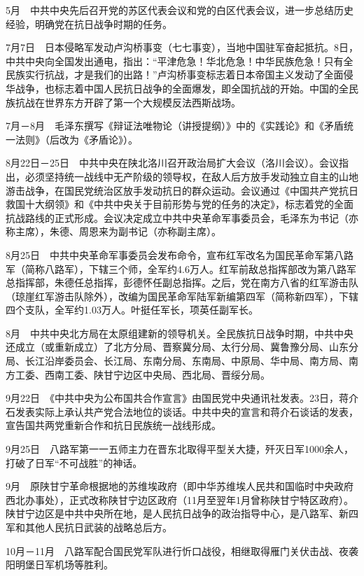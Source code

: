 \documentclass[10pt,a4paper,twocolumn]{book}
\begin{document}
5月　中共中央先后召开党的苏区代表会议和党的白区代表会议，进一步总结历史经验，明确党在抗日战争时期的任务。

7月7日　日本侵略军发动卢沟桥事变（七七事变），当地中国驻军奋起抵抗。8日，中共中央向全国发出通电，指出：“平津危急！华北危急！中华民族危急！只有全民族实行抗战，才是我们的出路！”卢沟桥事变标志着日本帝国主义发动了全面侵华战争，也标志着中国人民抗日战争的全面爆发，即全国抗战的开始。中国的全民族抗战在世界东方开辟了第一个大规模反法西斯战场。

7月－8月　毛泽东撰写《辩证法唯物论（讲授提纲）》中的《实践论》和《矛盾统一法则》（后改为《矛盾论》）。

8月22日－25日　中共中央在陕北洛川召开政治局扩大会议（洛川会议）。会议指出，必须坚持统一战线中无产阶级的领导权，在敌人后方放手发动独立自主的山地游击战争，在国民党统治区放手发动抗日的群众运动。会议通过《中国共产党抗日救国十大纲领》和《中共中央关于目前形势与党的任务的决定》，标志着党的全面抗战路线的正式形成。会议决定成立中共中央革命军事委员会，毛泽东为书记（亦称主席），朱德、周恩来为副书记（亦称副主席）。

8月25日　中共中央革命军事委员会发布命令，宣布红军改名为国民革命军第八路军（简称八路军），下辖三个师，全军约4.6万人。红军前敌总指挥部改为第八路军总指挥部，朱德任总指挥，彭德怀任副总指挥。之后，党在南方八省的红军游击队（琼崖红军游击队除外），改编为国民革命军陆军新编第四军（简称新四军），下辖四个支队，全军约1.03万人。叶挺任军长，项英任副军长。

8月　中共中央北方局在太原组建新的领导机关。全民族抗日战争时期，中共中央还成立（或重新成立）了北方分局、晋察冀分局、太行分局、冀鲁豫分局、山东分局、长江沿岸委员会、长江局、东南分局、东南局、中原局、华中局、南方局、南方工委、西南工委、陕甘宁边区中央局、西北局、晋绥分局。

9月22日　《中共中央为公布国共合作宣言》由国民党中央通讯社发表。23日，蒋介石发表实际上承认共产党合法地位的谈话。中共中央的宣言和蒋介石谈话的发表，宣告国共两党重新合作和抗日民族统一战线形成。

9月25日　八路军第一一五师主力在晋东北取得平型关大捷，歼灭日军1000余人，打破了日军“不可战胜”的神话。

9月　原陕甘宁革命根据地的苏维埃政府（即中华苏维埃人民共和国临时中央政府西北办事处），正式改称陕甘宁边区政府（11月至翌年1月曾称陕甘宁特区政府）。陕甘宁边区是中共中央所在地，是人民抗日战争的政治指导中心，是八路军、新四军和其他人民抗日武装的战略总后方。

10月－11月　八路军配合国民党军队进行忻口战役，相继取得雁门关伏击战、夜袭阳明堡日军机场等胜利。
\end{document}
